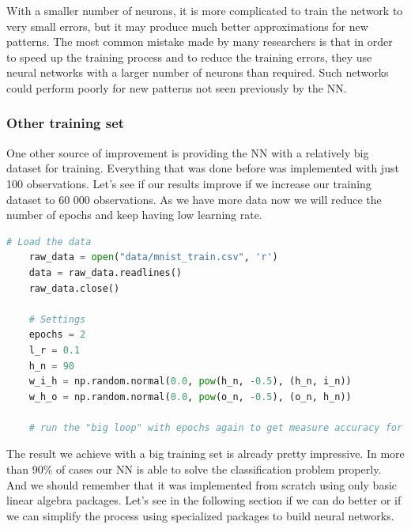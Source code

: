 With a smaller number of neurons, it is more complicated to train the network to very small errors, but it may produce much better approximations for new patterns. The most common mistake made by many researchers is that in order to speed up the training process and to reduce the training errors, they use neural networks with a larger number of neurons than required. Such networks could perform poorly for new patterns not seen previously by the NN.

\subsubsection{Other training set}

One other source of improvement is providing the NN with a relatively big dataset for training. Everything that was done before was implemented with just 100 observations. Let's see if our results improve if we increase our training dataset to 60 000 observations. As we have more data now we will reduce the number of epochs and keep having low learning rate.

\begin{lstlisting}[language=Python]   
    # Load the data
    raw_data = open("data/mnist_train.csv", 'r')
    data = raw_data.readlines()
    raw_data.close()
    
    # Settings
    epochs = 2
    l_r = 0.1
    h_n = 90
    w_i_h = np.random.normal(0.0, pow(h_n, -0.5), (h_n, i_n))
    w_h_o = np.random.normal(0.0, pow(o_n, -0.5), (o_n, h_n))
    
    # run the "big loop" with epochs again to get measure accuracy for new settings.
\end{lstlisting}

The result we achieve with a big training set is already pretty impressive. In more than 90\% of cases our NN is able to solve the classification problem properly. And we should remember that it was implemented from scratch using only basic linear algebra packages. Let's see in the following section if we can do better or if we can simplify the process using specialized packages to build neural networks.